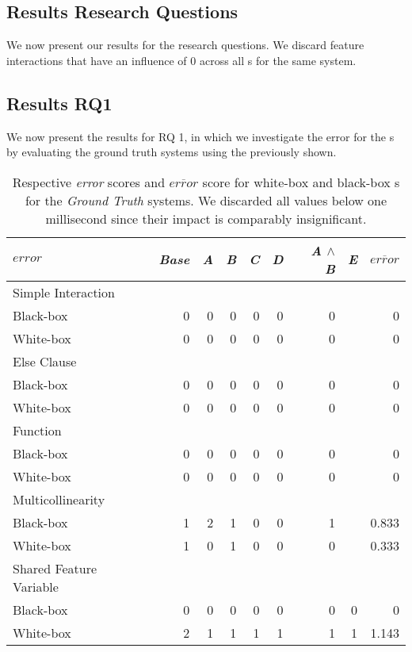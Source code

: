 \subsection{Results Research Questions}
We now present our results for the research questions. We discard feature interactions that have an influence of 0 
across all {\perfInfluenceModel}s for the same system.

\subsection*{Results RQ1}

We now present the results for RQ 1, in which we investigate the error for the {\perfInfluenceModel}s by
evaluating the ground truth systems using the {\perfInfluenceModel} previously shown.

\begin{table}[H]
    \centering
    \begin{tabular}{lrrrrrrrr}    \toprule
    $error$  &  \emph{Base} & \emph{A} & \emph{B} & \emph{C} & \emph{D} & \emph{A} $\land$ \emph{B} & \emph{E} & $\overline{error}$  \\ \midrule
    Simple Interaction &  &  & &  &  &  &     \\
    Black-box & 0 & 0 & 0 & 0 & 0 & 0  &  & 0  \\
    White-box & 0 & 0 & 0 & 0 & 0 & 0  &  & 0  \\ \midrule
    Else Clause &  &  & &  &  &  &     \\
    Black-box & 0 & 0 & 0 & 0 & 0 & 0  &  & 0  \\
    White-box & 0 & 0 & 0 & 0 & 0 & 0  &  & 0  \\ \midrule
    Function &  &  & &  &  &  &     \\
    Black-box & 0 & 0 & 0 & 0 & 0 & 0  &  & 0  \\
    White-box & 0 & 0 & 0 & 0 & 0 & 0  &  & 0  \\ \midrule
    Multicollinearity &  &  & &  &  &  &     \\
    Black-box & 1 & 2 & 1 & 0 & 0 & 1  &  & 0.833 \\
    White-box & 1 & 0 & 1 & 0 & 0 & 0  &  & 0.333 \\ \midrule
    Shared Feature Variable &  &  & &  &  &  &     \\
    Black-box & 0 & 0 & 0 & 0 & 0 & 0  & 0 &  0 \\
    White-box & 2 & 1 & 1 & 1 & 1 & 1  & 1 &  1.143 \\ \bottomrule
    \end{tabular}
    \caption{Respective \emph{error} scores and $\overline{error}$ score for white-box and black-box {\perfInfluenceModel}s for the \emph{Ground Truth} systems. 
    We discarded all values below one millisecond since their impact is comparably insignificant.}
    \label{rq1:ground-truth-results}
\end{table}


